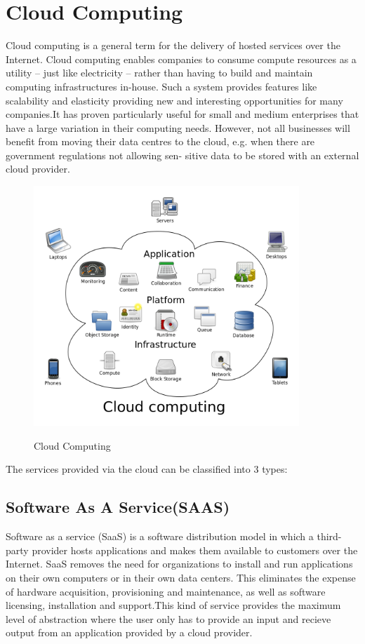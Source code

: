 \section{Cloud Computing}
Cloud computing is a general term for the delivery of hosted services over
the Internet.
Cloud computing enables companies to consume compute resources as a
utility – just like electricity – rather than having to build and maintain
computing infrastructures in-house. Such a system provides features like scalability and elasticity providing new and interesting opportunities for many
companies.It has proven particularly useful for small and
medium enterprises that have a large variation in their
computing needs. However, not all businesses will
benefit from moving their data centres to the cloud, e.g.
when there are government regulations not allowing sen-
sitive data to be stored with an external cloud provider.
\begin{figure}
\centering
\includegraphics[width=10cm]{images/cc.png}
\caption{\label{fig:cc}Cloud Computing}\cite{ccwiki}
\end{figure} 

The services provided via the cloud can be classified into 3 types:
\subsection{Software As A Service(SAAS)}
Software as a service (SaaS) is a software distribution model in which a third-party provider hosts applications and makes them available to customers over the Internet. SaaS removes the need for organizations to install and run applications on their own computers or in their own data centers. This eliminates the expense of hardware acquisition, provisioning and maintenance, as well as software licensing, installation and support.This kind of service provides the maximum level of abstraction where the user only has to provide an input and recieve output from an application provided by a cloud provider.

